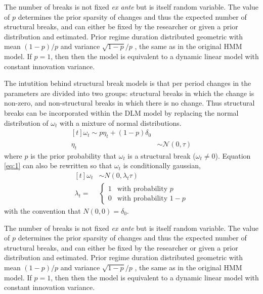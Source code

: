 \documentclass{article}
\newcommand{\paren}[1]{\ensuremath{\left(#1\right)}}
\newcommand{\dnorm}[1]{\ensuremath{\mathcal{N}\paren{#1}}}
\begin{document}
\begin{itemize}
The number of breaks is not fixed \textit{ex ante} but is itself random variable.
The value of $p$ determines the prior sparsity of changes and thus the expected number of structural breaks,
and can either be fixed by the researcher or given a prior distribution and estimated.
Prior regime duration distributed geometric with mean $(1 - p) / p$ and variance $\sqrt{1 - p} / p$ \parencite[68]{GiordaniKohn2008}, the same as in the original \textcite{Chib1998} HMM model.
If $p = 1$, then then the model is equivalent to a dynamic linear model with constant innovation variance.

The intutition behind structural break models is that per period changes in the parameters are divided into two groups: structural breaks in which the change is non-zero, and non-structural breaks in which there is no change.
Thus structural breaks can be incorporated within the DLM model by replacing the normal distribution of $\omega_{t}$ with a mixture of normal distributions.
\begin{equation}
  \label{eq:1}
  \begin{aligned}[t]
    \omega_{t} \sim p \eta_{t}  + (1 - p) \delta_{0} \\
    \eta_{t} & \sim \dnorm{0, \tau} 
  \end{aligned}
\end{equation}
where $p$ is the prior probability that $\omega_{t}$ is a structural break ($\omega_{t} \neq 0$).
Equation \eqref{eq:1} can also be rewritten so that $\omega_{t}$ is conditionally gaussian,
\begin{equation}
  \label{eq:7}
  \begin{aligned}[t]
    \omega_{t} & \sim N(0, \lambda_{t} \tau) \\
    \lambda_{t} = & 
    \begin{cases}
      1 & \text{with probability $p$} \\
      0 & \text{with probability $1 - p$}
    \end{cases}
  \end{aligned}
\end{equation}
with the convention that $N(0, 0) = \delta_{0}$. 

The number of breaks is not fixed \textit{ex ante} but is itself random variable.
The value of $p$ determines the prior sparsity of changes and thus the expected number of structural breaks,
and can either be fixed by the researcher or given a prior distribution and estimated.
Prior regime duration distributed geometric with mean $(1 - p) / p$ and variance $\sqrt{1 - p} / p$ \parencite[68]{GiordaniKohn2008}, the same as in the original \textcite{Chib1998} HMM model.
If $p = 1$, then then the model is equivalent to a dynamic linear model with constant innovation variance.


\end{itemize}
\end{document}
